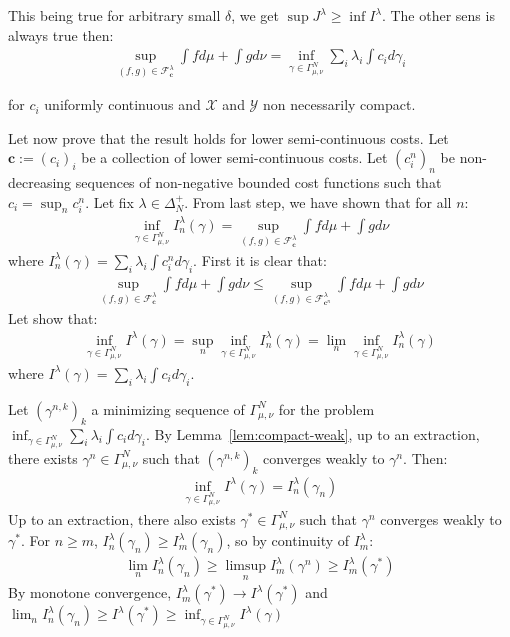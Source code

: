 \begin{prv*}
This being true for arbitrary small $\delta$, we get $\sup J^\lambda\geq\inf I^\lambda$. The other sens is always true then:
\begin{align*}
\sup\limits_{(f,g)\in\mathcal{F}^\lambda_\mathbf{c}}\int fd\mu+\int gd\nu = \inf\limits_{\gamma\in\Gamma^N_{\mu,\nu}}\sum_i\lambda_i \int c_id\gamma_i
\end{align*}

for $c_i$ uniformly continuous and $\mathcal{X}$ and $\mathcal{Y}$ non necessarily compact.

\medskip
Let now prove that the result holds for lower semi-continuous costs. Let $\mathbf{c}:=(c_i)_i$ be a collection of lower semi-continuous costs. Let $(c^n_i)_n$ be non-decreasing sequences of non-negative bounded cost functions such that $c_i=\sup_n c^n_i$. Let fix $\lambda\in\Delta_N^{+}$. From last step, we have shown that for all $n$:
\begin{align}
    \label{eq:eq_on_cont}
    \inf_{\gamma\in \Gamma^N_{\mu,\nu}} I^\lambda_n(\gamma)= \sup\limits_{(f,g)\in\mathcal{F}^\lambda_\mathbf{c}}\int fd\mu+\int gd\nu
\end{align}
where $I^\lambda_n(\gamma)=\sum_i\lambda_i \int c^n_id\gamma_i$. First it is clear that:
\begin{align}
\label{eq:ineq_sup}
\sup\limits_{(f,g)\in\mathcal{F}^\lambda_\mathbf{c}}\int fd\mu+\int gd\nu\leq \sup\limits_{(f,g)\in\mathcal{F}^{\lambda}_{\mathbf{c}^n}}\int fd\mu+\int gd\nu
\end{align}
Let show that:
\begin{align*}
\inf_{\gamma\in \Gamma^N_{\mu,\nu}} I^\lambda(\gamma)=\sup_n\inf_{\gamma\in \Gamma^N_{\mu,\nu}} I^\lambda_n(\gamma) = \lim_n\inf_{\gamma\in \Gamma^N_{\mu,\nu}} I^\lambda_n(\gamma)
\end{align*}
where $I^\lambda(\gamma) = \sum_i\lambda_i \int c_id\gamma_i$. 

Let $(\gamma^{n,k})_k$ a minimizing sequence of $\Gamma^N_{\mu,\nu}$ for the problem $\inf_{\gamma\in \Gamma^N_{\mu,\nu}} \sum_i\lambda_i \int c_id\gamma_i$. By Lemma~\ref{lem:compact-weak}, up to an extraction, there exists  $\gamma^n\in \Gamma^N_{\mu,\nu}$ such that $(\gamma^{n,k})_k$ converges weakly to $\gamma^n$. Then:
\begin{align*}
\inf_{\gamma\in \Gamma^N_{\mu,\nu}} I^\lambda(\gamma) =I^\lambda_n(\gamma_n)
\end{align*}
Up to an extraction, there also exists $\gamma^*\in\Gamma^N_{\mu,\nu}$ such that $\gamma^n$ converges weakly to $\gamma^*$. For $n\geq m$, $I^\lambda_n(\gamma_n) \geq I^\lambda_m(\gamma_n)$, so by continuity of $I^\lambda_m$:
\begin{align*}
\lim_n I^\lambda_n(\gamma_n) \geq\limsup_n I^\lambda_m(\gamma^n)\geq I^\lambda_m(\gamma^*)
\end{align*}
By monotone convergence, $I^\lambda_m(\gamma^*)\rightarrow I^\lambda(\gamma^*)$ and $\lim_nI^\lambda_n(\gamma_n) \geq I^\lambda(\gamma^*)\geq\inf_{\gamma\in\Gamma^N_{\mu,\nu}}I^\lambda(\gamma)$


\end{prv*}
